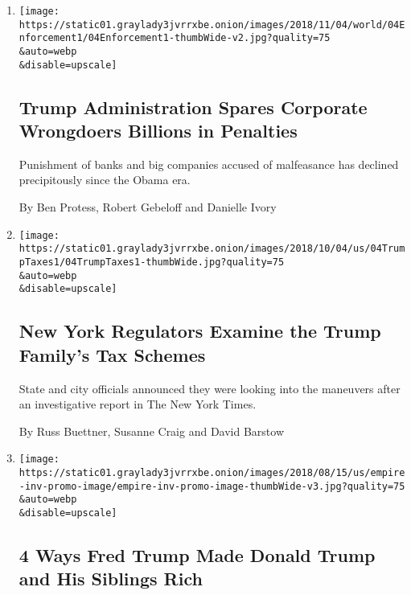 \begin{enumerate}
\def\labelenumi{\arabic{enumi}.}
\item
  \href{/2018/11/03/us/trump-sec-doj-corporate-penalties.html}{}

  \texttt{[image: https://static01.graylady3jvrrxbe.onion/images/2018/11/04/world/04Enforcement1/04Enforcement1-thumbWide-v2.jpg?quality=75\\\&auto=webp\\\&disable=upscale]}

  \hypertarget{trump-administration-spares-corporate-wrongdoers-billions-in-penalties}{%
  \subsection{Trump Administration Spares Corporate Wrongdoers Billions
  in
  Penalties}\label{trump-administration-spares-corporate-wrongdoers-billions-in-penalties}}

  Punishment of banks and big companies accused of malfeasance has
  declined precipitously since the Obama era.

  By Ben Protess, Robert Gebeloff and Danielle Ivory
\item
  \href{/2018/10/04/us/politics/donald-trump-fred-trump-tax-schemes.html}{}

  \texttt{[image: https://static01.graylady3jvrrxbe.onion/images/2018/10/04/us/04TrumpTaxes1/04TrumpTaxes1-thumbWide.jpg?quality=75\\\&auto=webp\\\&disable=upscale]}

  \hypertarget{new-york-regulators-examine-the-trump-familys-tax-schemes}{%
  \subsection{New York Regulators Examine the Trump Family's Tax
  Schemes}\label{new-york-regulators-examine-the-trump-familys-tax-schemes}}

  State and city officials announced they were looking into the
  maneuvers after an investigative report in The New York Times.

  By Russ Buettner, Susanne Craig and David Barstow
\item
  \href{/interactive/2018/10/02/us/politics/trump-family-wealth.html}{}

  \texttt{[image: https://static01.graylady3jvrrxbe.onion/images/2018/08/15/us/empire-inv-promo-image/empire-inv-promo-image-thumbWide-v3.jpg?quality=75\\\&auto=webp\\\&disable=upscale]}

  \hypertarget{4-ways-fred-trump-made-donald-trump-and-his-siblings-rich}{%
  \subsection{4 Ways Fred Trump Made Donald Trump and His Siblings
  Rich}\label{4-ways-fred-trump-made-donald-trump-and-his-siblings-rich}}


\end{enumerate}
